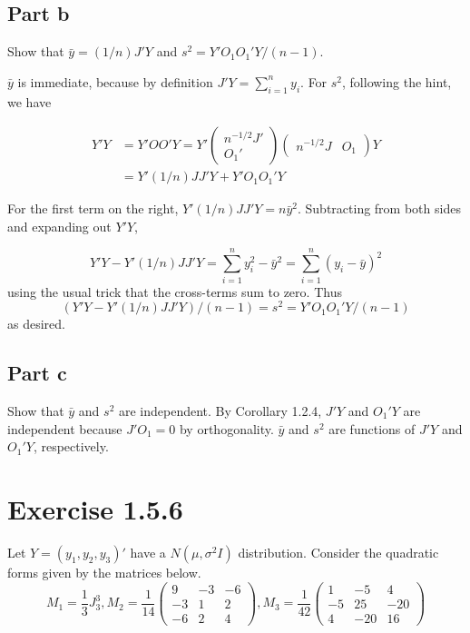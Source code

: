 \documentclass{article}
\begin{document}
\subsection*{Part b}

Show that $\bar{y} = (1/n)J'Y$ and $s^2 = Y'O_1O_1'Y/(n-1)$.

$\bar{y}$ is immediate, because by definition $J'Y = \sum_{i=1}^n y_i$. For $s^2$, following the hint, we have

\begin{align*}
Y'Y &= Y'OO'Y =
Y'\begin{pmatrix} n^{-1/2}J' \\ O_1'\end{pmatrix}
\begin{pmatrix} n^{-1/2}J & O_1\end{pmatrix}Y \\
&=Y'(1/n)JJ'Y + Y'O_1O_1'Y
\end{align*}

For the first term on the right, $Y'(1/n)JJ'Y = n\bar{y}^2$. Subtracting from both sides and expanding out $Y'Y$,

\[
Y'Y - Y'(1/n)JJ'Y = \sum_{i=1}^n y_i^2 - \bar{y}^2 = \sum_{i=1}^n(y_i-\bar{y})^2
\]
using the usual trick that the cross-terms sum to zero. Thus
\[
\left(Y'Y-Y'(1/n)JJ'Y\right)/(n-1) = s^2 = Y'O_1O_1'Y/(n-1)
\]
as desired.
\subsection*{Part c}
Show that $\bar{y}$ and $s^2$ are independent.
By Corollary 1.2.4, $J'Y$ and $O_1'Y$ are independent because $J'O_1=0$ by orthogonality. $\bar{y}$ and $s^2$ are functions of $J'Y$ and $O_1'Y$, respectively.

\section*{Exercise 1.5.6}
Let $Y = (y_1, y_2, y_3)'$ have a $N(\mu, \sigma^2I)$ distribution. Consider the quadratic forms given by the matrices below.
\[
M_1 = \frac{1}{3}J_3^3, M_2 = \frac{1}{14}
\begin{pmatrix}
9 & -3 & -6 \\
-3 & 1 & 2 \\
-6 & 2 & 4
\end{pmatrix},
M_3 = \frac{1}{42}
\begin{pmatrix}
1 & -5 & 4 \\
-5 & 25 & -20 \\
4 & -20 & 16
\end{pmatrix}
\]
\end{document}
